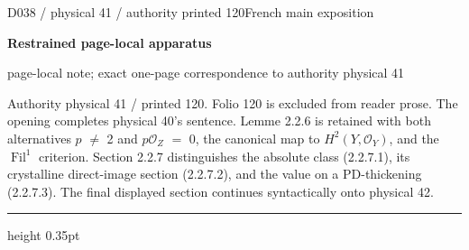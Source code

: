 \documentclass[9pt]{article}
\newcommand{\CanonText}[1]{\par{\fontsize{8.0}{9.35}\selectfont\RaggedRight #1\par}\vspace{2.2pt}}
\newcommand{\LayerTitle}{Restrained page-local apparatus}
\begin{document}
\noindent\begin{minipage}[t][\dimexpr\textheight-5pt\relax][t]{\textwidth}
{\sffamily\fontsize{7.3}{8.2}\selectfont\color{Quiet} D038 / physical 41 / authority printed 120\hfill French main exposition}
\par{}\vspace{4.5pt}
{\sffamily\fontsize{10.4}{11.6}\selectfont\bfseries\color{Accent} \LayerTitle}
\par{\sffamily\fontsize{6.7}{7.7}\selectfont\color{Quiet} page-local note; exact one-page correspondence to authority physical 41}
\vspace{5pt}
\CanonText{Authority physical 41 / printed 120. Folio 120 is excluded from reader prose. The opening completes physical 40's sentence. Lemme 2.2.6 is retained with both alternatives \(p\) \(\neq{}\) 2 and \(p\mathcal{O}_{Z}\) \(=\) 0, the canonical map to \(H^{2}(Y,\mathcal{O}_{Y})\), and the \(\operatorname{Fil}^{1}\) criterion. Section 2.2.7 distinguishes the absolute class (2.2.7.1), its crystalline direct-image section (2.2.7.2), and the value on a PD-thickening (2.2.7.3). The final displayed section continues syntactically onto physical 42.}
\vfill
{\color{Accent}\hrule height 0.35pt}\vspace{3pt}
\end{minipage}
\newpage
\end{document}
